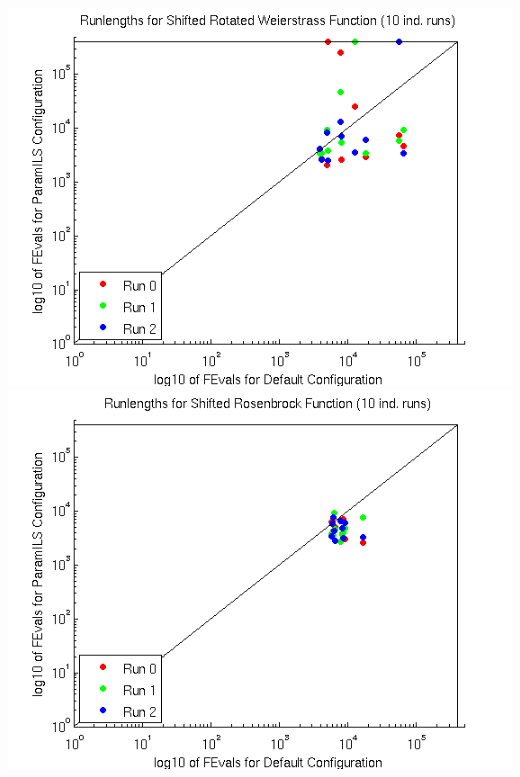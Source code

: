 \begin{center}
\hfill \includegraphics[scale=0.45]{scatterWeierstrass.png} \quad \includegraphics[scale=0.45]{scatterRosenbrock.png} \hfill \\

\end{center}
